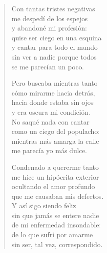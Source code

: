 \documentclass[12pt]{article}
\begin{document}
\clearpage
{}
\begin{verse}

Con tantas tristes negativas\\
me despedí de los espejos\\
y abandoné mi profesión:\\
quise ser ciego en una esquina\\
y cantar para todo el mundo\\
sin ver a nadie porque todos\\
se me parecían un poco.  

Pero buscaba mientras tanto\\
cómo mirarme hacia detrás,\\
hacia donde estaba sin ojos\\
y era oscura mi condición.\\
No saqué nada con cantar\\
como un ciego del populacho:\\
mientras más amarga la calle\\
me parecía yo más dulce.  

Condenado a quererme tanto\\
me hice un hipócrita exterior\\
ocultando el amor profundo\\
que me causaban mis defectos.\\
Y así sigo siendo feliz\\
sin que jamás se entere nadie\\
de mi enfermedad insondable:\\
de lo que sufrí por amarme\\
sin ser, tal vez, correspondido.  

\end{verse}
\end{document}
